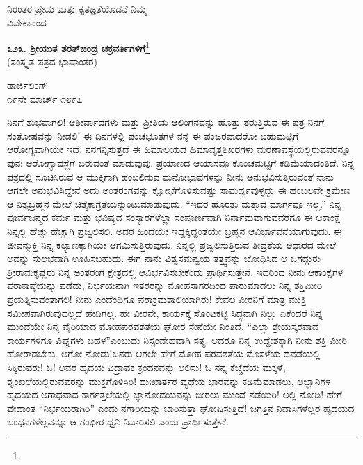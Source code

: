 \vspace{-0.5cm}

{\flushright
ನಿರಂತರ ಪ್ರೇಮ ಮತ್ತು ಕೃತಜ್ಞತೆಯೊಡನೆ ನಿಮ್ಮ\\ವಿವೇಕಾನಂದ\par}

\begin{center}
\textbf{೩೨೩. ಶ‍್ರೀಯುತ ಶರತ್‌ಚಂದ್ರ ಚಕ್ರವರ್ತಿಗಳಿಗೆ}\footnote{}\\ (ಸಂಸ್ಕೃತ ಪತ್ರದ ಭಾಷಾಂತರ)
\end{center}

\vspace{-0.65cm}

\begin{flushright}
ಡಾರ್ಜಿಲಿಂಗ್\\೧೯ನೇ ಮಾರ್ಚ್ ೧೮೯೭
\end{flushright}

ನಿನಗೆ ಶುಭವಾಗಲಿ! ಆಶೀರ್ವಾದಗಳು ಮತ್ತು ಪ್ರೀತಿಯ ಆಲಿಂಗನವನ್ನು ಹೊತ್ತು ತರುತ್ತಿರುವ ಈ ಪತ್ರ ನಿನಗೆ ಸಂತೋಷವನ್ನು ನೀಡಲಿ! ಈ ದಿನಗಳಲ್ಲಿ ಪಂಚಭೂತಗಳ ನನ್ನ ಈ ಪಂಜರವಾದರೋ ಬಹುಮಟ್ಟಿಗೆ ಆರೋಗ್ಯವಾಗಿಯೇ ಇದೆ. ನನಗನ್ನಿಸುತ್ತದೆ ಈ ಹಿಮಾಲಯದ ಹಿಮಾವೃತ್ತಶಿಖರಗಳು ಮರಣಾವಸ್ಥೆಯಲ್ಲಿರುವವರನ್ನೂ ಪುನಃ ಆರೋಗ್ಯಾವಸ್ಥೆಗೆ ಬರುವಂತೆ ಮಾಡುವುವು. ಪ್ರಯಾಣದ ಆಯಾಸವೂ ಕೊಂಚಮಟ್ಟಿಗೆ ಕಡಿಮೆಯಾದಂತಿದೆ. ನಿನ್ನ ಪತ್ರದಲ್ಲಿ ಸೂಚಿಸಿರುವ ಆ ಮುಕ್ತಿಗಾಗಿ ಹಂಬಲಿಸುವ ಮನೋಭಾವಗಳನ್ನು ನೀನು ಅನುಭವಿಸುತ್ತಿರುವಂತೆ ನಾನು ಆಗಲೇ ಅನುಭವಿಸಿದ್ದೇನೆ\enginline{-} ಅದು ಅಂತರಂಗವನ್ನು ಕ್ಷೋಭೆಗೊಳಿಸುವಷ್ಟು ಸಾಮರ್ಥ್ಯವುಳ್ಳದ್ದು\enginline{-} ಈ ಹಂಬಲವೇ ಕ್ರಮೇಣ ಆ ನಿತ್ಯಬ್ರಹ್ಮನ ಮೇಲೆ ಚಿತ್ತೈಕಾಗ್ರತೆಯನ್ನುಂಟುಮಾಡುವುದು. “ಇದರ ಹೊರತು ಮತ್ತಾವ ಮಾರ್ಗವೂ ಇಲ್ಲ.” ನಿನ್ನ ಪೂರ್ವಜನ್ಮದ ಕರ್ಮ ಮತ್ತು ಭವಿಷ್ಯದ ಸಂಸ್ಕಾರಗಳೆಲ್ಲಾ ಸಂಪೂರ್ಣವಾಗಿ ನಿರ್ನಾಮವಾಗುವವರೆಗೂ ಈ ಆಕಾಂಕ್ಷೆ ನಿನ್ನಲ್ಲಿ ಹೆಚ್ಚು ಹೆಚ್ಚಾಗಿ ಪ್ರಜ್ವಲಿಸಲಿ. ಅದರ ಹಿಂದೆಯೇ ಇದ್ದಕ್ಕಿದ್ದಂತೆಯೇ ಬ್ರಹ್ಮನ ಆವಿರ್ಭಾವನೆಯಾಗುವುದು. ಈ ಜೀವನ್ಮುಕ್ತಿ ನಿನ್ನ ಕಲ್ಯಾಣಕ್ಕಾಗಿಯೇ ಆಗಮಿಸುತ್ತಿರುವುದು. ನಿನ್ನಲ್ಲಿ ಪ್ರಜ್ವಲಿಸುತ್ತಿರುವ ತೀವ್ರತೆಯ ಆಧಾರದ ಮೇಲೆ ಅದನ್ನು ಸುಲಭವಾಗಿ ಊಹಿಸಬಹುದು. ಈಗ ನಾನು ವಿಶ್ವಸಮನ್ವಯ ತತ್ತ್ವವನ್ನು ಬೋಧಿಸಿದ ಆ ಜಗದ್ಗುರು ಶ‍್ರೀರಾಮಕೃಷ್ಣರು ನಿನ್ನ ಅಂತರಂಗ ಕ್ಷೇತ್ರದಲ್ಲಿ ಆವಿರ್ಭವಿಸಬೇಕೆಂದು ಪ್ರಾರ್ಥಿಸುತ್ತೇನೆ. ಇದರಿಂದ ನೀನು ಆಕಾಂಕ್ಷೆಗಳ ಪರಾಕಾಷ್ಠೆಯನ್ನು ಪಡೆದು, ನಿರ್ಭಯನಾಗಿ ಇತರರನ್ನು ಮೋಹಸಾಗರದಿಂದ ಪಾರುಮಾಡಲು ನಿನ್ನ ಶಕ್ತಿಮೀರಿ ಪ್ರಯತ್ನಿಸುವಂತಾಗಲಿ! ನೀನು ಎಂದೆಂದಿಗೂ ಪರಾಕ್ರಮಶಾಲಿಯಾಗಿರು! ಕೇವಲ ವೀರನಿಗೆ ಮಾತ್ರ ಮುಕ್ತಿ ಸಮೀಪವಾಗಿರುವುದಲ್ಲದೆ ಹೇಡಿಗಲ್ಲ. ಹೇ ವೀರನೇ, ಕಾರ್ಯಕ್ಕೆ ಸೊಂಟಕಟ್ಟಿ ಸಿದ್ಧನಾಗಿ ನಿಲ್ಲು\enginline{-} ಏಕೆಂದರೆ ನಿನ್ನ ಮುಂದೆಯೇ ನಿನ್ನ ವೈರಿಯಾದ ಮೋಹಪರವಶತೆಯ ಘೋರ ಸೇನೆಯೇ ನಿಂತಿದೆ. “ಎಲ್ಲಾ ಶ್ರೇಯಸ್ಕರವಾದ ಕಾರ್ಯಗಳಿಗೂ ವಿಘ್ನಗಳು ಬಹಳ”ಎಂಬುದು ನಿಸ್ಸಂದೇಹವಾಗಿ ಸತ್ಯ. ಆದರೂ ನಿನ್ನ ಉದ್ದೇಶಕ್ಕಾಗಿ ನೀನು ಶಕ್ತಿ ಮೀರಿ ಹೋರಾಡಬೇಕು. ಅಗೋ ನೋಡು!ಜನರು ಆಗಲೇ ಹೇಗೆ ಮೋಹ ಪರವಶತೆಯ ಮೊಸಳೆಯ ದವಡೆಯಲ್ಲಿ ಸಿಕ್ಕಿರುವರು! ಓ! ಅವರ ಹೃದಯ ವಿದ್ರಾವಕ ಕ್ರಂದನವನ್ನು ಆಲಿಸು! ಓ ನನ್ನ ಕೆಚ್ಚೆದೆಯ ಮಕ್ಕಳೆ, ಶೃಂಖಲೆಯಲ್ಲಿರುವವರನ್ನು ಮುಕ್ತಗೊಳಿಸಿರಿ! ದುಃಖಾರ್ತರ ವ್ಯಥೆಯ ಭಾರವನ್ನು ಕಡಿಮೆಮಾಡಲು, ಅಜ್ಞಾನಿಗಳ ಹೃದಯದ ಅಗಾಧವಾದ ಕಾರ್ಗತ್ತಲೆಯಲ್ಲಿ ಜ್ಞಾನೋದಯವನ್ನು ಬೀರಲು ಮುಂದೆ ನಡೆಯಿರಿ! ಅಲ್ಲಿ ನೋಡಿ! ಹೇಗೆ ವೇದಾಂತ “ನಿರ್ಭಯರಾಗಿರಿ” ಎಂದು ನಗಾರಿಯನ್ನು ಬಾರಿಸುತ್ತಾ ಘೋಷಿಸುತ್ತಿದೆ! ಜಗತ್ತಿನ ನಿವಾಸಿಗಳೆಲ್ಲರ ಹೃದಯದ ಬಂಧನಗಳೆಲ್ಲವನ್ನೂ ಆ ಗಂಭೀರ ಧ್ವನಿ ನಿವಾರಿಸಲಿ ಎಂದು ಪ್ರಾರ್ಥಿಸುತ್ತೇನೆ.

